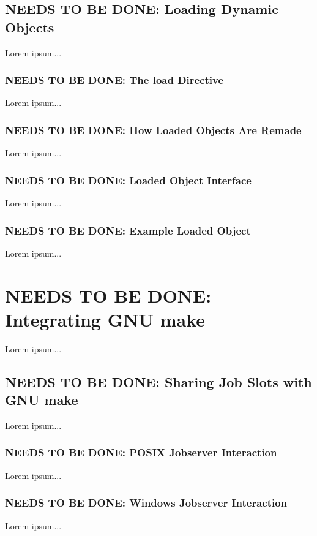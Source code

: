 \documentclass{charun}
\begin{document}
\begin{multicols*}{2}
\color{gray}
\subsection{NEEDS TO BE DONE: Loading Dynamic Objects}
Lorem ipsum...
\color{black}

\color{gray}
\subsubsection{NEEDS TO BE DONE: The load Directive}
Lorem ipsum...
\color{black}

\color{gray}
\subsubsection{NEEDS TO BE DONE: How Loaded Objects Are Remade}
Lorem ipsum...
\color{black}

\color{gray}
\subsubsection{NEEDS TO BE DONE: Loaded Object Interface}
Lorem ipsum...
\color{black}

\color{gray}
\subsubsection{NEEDS TO BE DONE: Example Loaded Object}
Lorem ipsum...
\color{black}


\color{gray}
\section{NEEDS TO BE DONE: Integrating GNU make}
Lorem ipsum...
\color{black}


\color{gray}
\subsection{NEEDS TO BE DONE: Sharing Job Slots with GNU make}
Lorem ipsum...
\color{black}

\color{gray}
\subsubsection{NEEDS TO BE DONE: POSIX Jobserver Interaction}
Lorem ipsum...
\color{black}

\color{gray}
\subsubsection{NEEDS TO BE DONE: Windows Jobserver Interaction}
Lorem ipsum...
\color{black}


\end{multicols*}
\end{document}
